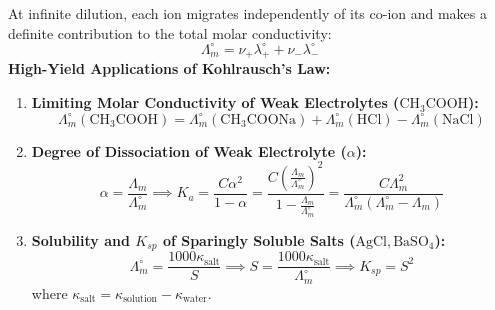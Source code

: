 \documentclass[10pt,twoside,openright]{book}
\begin{document}
\begin{formulabox}
At infinite dilution, each ion migrates independently of its co-ion and makes a definite contribution to the total molar conductivity:
\begin{equation}
  \Lambda_m^\circ = \nu_+ \lambda_+^\circ + \nu_- \lambda_-^\circ
\end{equation}
\textbf{High-Yield Applications of Kohlrausch's Law:}
\begin{enumerate}
  \item \textbf{Limiting Molar Conductivity of Weak Electrolytes ($\mathrm{CH_3COOH}$):}
  \begin{equation}
    \Lambda_m^\circ(\mathrm{CH_3COOH}) = \Lambda_m^\circ(\mathrm{CH_3COONa}) + \Lambda_m^\circ(\mathrm{HCl}) - \Lambda_m^\circ(\mathrm{NaCl})
  \end{equation}
  \item \textbf{Degree of Dissociation of Weak Electrolyte ($\alpha$):}
  \begin{equation}
    \alpha = \frac{\Lambda_m}{\Lambda_m^\circ} \implies K_a = \frac{C \alpha^2}{1 - \alpha} = \frac{C \left(\frac{\Lambda_m}{\Lambda_m^\circ}\right)^2}{1 - \frac{\Lambda_m}{\Lambda_m^\circ}} = \frac{C \Lambda_m^2}{\Lambda_m^\circ(\Lambda_m^\circ - \Lambda_m)}
  \end{equation}
  \item \textbf{Solubility and $K_{sp}$ of Sparingly Soluble Salts ($\mathrm{AgCl, BaSO_4}$):}
  \begin{equation}
    \Lambda_m^\circ = \frac{1000 \kappa_{\text{salt}}}{S} \implies S = \frac{1000 \kappa_{\text{salt}}}{\Lambda_m^\circ} \implies K_{sp} = S^2
  \end{equation}
  where $\kappa_{\text{salt}} = \kappa_{\text{solution}} - \kappa_{\text{water}}$.
\end{enumerate}
\end{formulabox}
\end{document}
